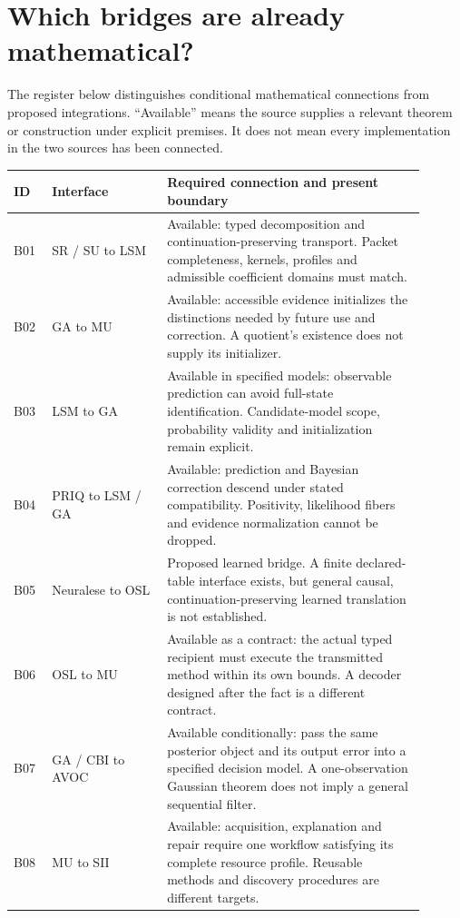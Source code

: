 \documentclass[11pt,oneside]{article}
\begin{document}
\section{Which bridges are already mathematical?}
The register below distinguishes conditional mathematical connections from proposed integrations. ``Available'' means the source supplies a relevant theorem or construction under explicit premises. It does not mean every implementation in the two sources has been connected.

\small
\begin{longtable}{@{}p{0.08\linewidth}p{0.25\linewidth}p{0.57\linewidth}@{}}
\toprule ID & Interface & Required connection and present boundary\\\midrule\endhead
B01 & SR / SU to LSM & Available: typed decomposition and continuation-preserving transport. Packet completeness, kernels, profiles and admissible coefficient domains must match.\\
B02 & GA to MU & Available: accessible evidence initializes the distinctions needed by future use and correction. A quotient's existence does not supply its initializer.\\
B03 & LSM to GA & Available in specified models: observable prediction can avoid full-state identification. Candidate-model scope, probability validity and initialization remain explicit.\\
B04 & PRIQ to LSM / GA & Available: prediction and Bayesian correction descend under stated compatibility. Positivity, likelihood fibers and evidence normalization cannot be dropped.\\
B05 & Neuralese to OSL & Proposed learned bridge. A finite declared-table interface exists, but general causal, continuation-preserving learned translation is not established.\\
B06 & OSL to MU & Available as a contract: the actual typed recipient must execute the transmitted method within its own bounds. A decoder designed after the fact is a different contract.\\
B07 & GA / CBI to AVOC & Available conditionally: pass the same posterior object and its output error into a specified decision model. A one-observation Gaussian theorem does not imply a general sequential filter.\\
B08 & MU to SII & Available: acquisition, explanation and repair require one workflow satisfying its complete resource profile. Reusable methods and discovery procedures are different targets.\\

\end{longtable}
\end{document}
